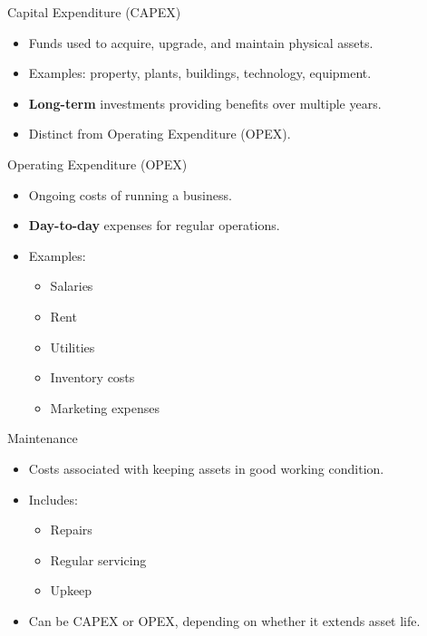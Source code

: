 \begin{frame}{Capital Expenditure (CAPEX)}
  \begin{itemize}
    \item Funds used to acquire, upgrade, and maintain physical assets.
    \item Examples: property, plants, buildings, technology, equipment.
    \item \textbf{Long-term} investments providing benefits over multiple years.
    \item Distinct from Operating Expenditure (OPEX).
  \end{itemize}
\end{frame}

\begin{frame}{Operating Expenditure (OPEX)}
  \begin{itemize}
    \item Ongoing costs of running a business.
    \item \textbf{Day-to-day} expenses for regular operations.
    \item Examples:
      \begin{itemize}
        \item Salaries
        \item Rent
        \item Utilities
        \item Inventory costs
        \item Marketing expenses
      \end{itemize}
  \end{itemize}
\end{frame}

\begin{frame}{Maintenance}
  \begin{itemize}
    \item Costs associated with keeping assets in good working condition.
    \item Includes:
      \begin{itemize}
        \item Repairs
        \item Regular servicing
        \item Upkeep
      \end{itemize}
    \item Can be CAPEX or OPEX, depending on whether it extends asset life.
  \end{itemize}
\end{frame}

